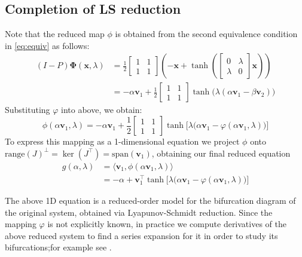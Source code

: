 \documentclass[letterpaper, 10 pt, conference, dvipsnames]{ieeeconf}
\begin{document}
\subsection{Completion of LS reduction}
Note that the reduced map \(\phi\) is obtained from the second equivalence condition in \eqref{eq:equiv} as follows:
\begin{align*}
    (I-P)\boldsymbol{\Phi}(\mathbf{x},\lambda) & = \frac12\begin{bmatrix}1&1\\1&1\end{bmatrix}\left(-\mathbf{x}+\tanh\left(\begin{bmatrix}0&\lambda\\\lambda&0\end{bmatrix}\mathbf{x}\right)\right) \\
                                               & = -\alpha\mathbf{v}_1+\frac12\begin{bmatrix}1&1\\1&1\end{bmatrix}\tanh\big(\lambda(\alpha\mathbf{v}_1-\beta\mathbf{v}_2)\big)
\end{align*}
Substituting \(\varphi\) into above, we obtain:
\begin{equation*}
    \boxed{\phi(\alpha\mathbf{v}_1,\lambda) = -\alpha\mathbf{v}_1+\frac12\begin{bmatrix}1&1\\1&1\end{bmatrix}\tanh\Big[\lambda\big(\alpha\mathbf{v}_1-\varphi(\alpha\mathbf{v}_{1},\lambda)\big)\Big]}
\end{equation*}
To express this mapping as a 1-dimensional equation we project \(\phi\) onto \( \mathrm{range}(J)^\perp = \ker(J^\top) = \mathrm{span}(\mathbf{v}_1)\), obtaining our final reduced equation
\begin{align*}
    g(\alpha,\lambda) & = \langle\mathbf{v}_1,\phi(\alpha\mathbf{v}_1,\lambda)\rangle                                                       \\
                      & = -\alpha+\mathbf{v}_1^\top\tanh\Big[\lambda\big(\alpha\mathbf{v}_1-\varphi(\alpha\mathbf{v}_{1},\lambda)\big)\Big]
\end{align*}

The above 1D equation is a reduced-order model for the bifurcation diagram of the original system, obtained via Lyapunov-Schmidt reduction. Since the mapping \(\varphi\) is not explicitly known, in practice we compute derivatives of the above reduced system to find a series expansion for it in order to study its bifurcations;for example see \cite[II.9]{Golubitsky1985}.
\end{document}
